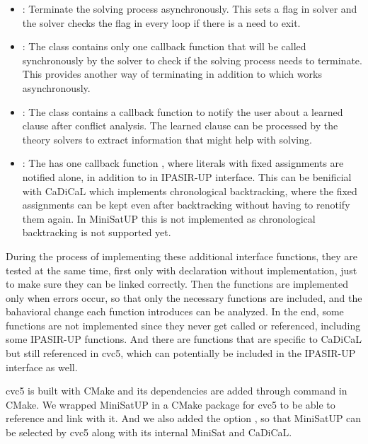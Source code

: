 \begin{itemize}
\begin{itemize}
    \item {}: Terminate the solving process asynchronously. This sets a flag in solver and the solver checks the flag in every loop if there is a need to exit.
    \item {}: The  class contains only one callback function  that will be called synchronously by the solver to check if the solving process needs to terminate. This provides another way of terminating in addition to  which works asynchronously.
    \item {}: The  class contains a callback function  to notify the user about a learned clause after conflict analysis. The learned clause can be processed by the theory solvers to extract information that might help with solving.
    \item {}: The  has one callback function , where literals with fixed assignments are notified alone, in addition to  in IPASIR-UP interface. This can be benificial with CaDiCaL which implements chronological backtracking, where the fixed assignments can be kept even after backtracking without having to renotify them again. In MiniSatUP this is not implemented as chronological backtracking is not supported yet.
  \end{itemize}
\end{itemize}

During the process of implementing these additional interface functions, they are tested at the same time, first only with declaration without implementation, just to make sure they can be linked correctly. Then the functions are implemented only when errors occur, so that only the necessary functions are included, and the bahavioral change each function introduces can be analyzed. In the end, some functions are not implemented since they never get called or referenced, including some IPASIR-UP functions. And there are functions that are specific to CaDiCaL but still referenced in cvc5, which can potentially be included in the IPASIR-UP interface as well.

cvc5 is built with CMake and its dependencies are added through  command in CMake. We wrapped MiniSatUP in a CMake package for cvc5 to be able to reference and link with it. And we also added the option , so that MiniSatUP can be selected by cvc5 along with its internal MiniSat and CaDiCaL.
